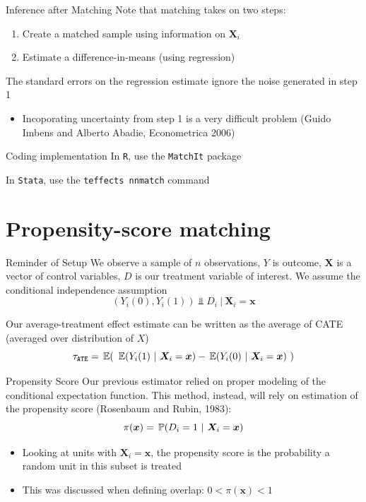 \documentclass[aspectratio=169,t,11pt,table]{beamer}
\begin{document}
\begin{frame}{Inference after Matching}
  Note that matching takes on two steps:
  \begin{enumerate}
    \item Create a matched sample using information on $\bm{X}_i$
    \item Estimate a difference-in-means (using regression)
  \end{enumerate}

  The standard errors on the regression estimate ignore the noise generated in step 1
  \begin{itemize}
    \item Incoporating uncertainty from step 1 is a very difficult problem (Guido Imbens and Alberto Abadie, Econometrica 2006)
  \end{itemize}
\end{frame}

\begin{frame}{Coding implementation}
  In \texttt{R}, use the \texttt{MatchIt} package

  \bigskip
  In \texttt{Stata}, use the \texttt{teffects nnmatch} command 
\end{frame}

\section{Propensity-score matching}

\begin{frame}{Reminder of Setup}
  We observe a sample of $n$ observations, $Y$ is outcome, $\bm{X}$ is a vector of control variables, $D$ is our treatment variable of interest. We assume the conditional independence assumption
  $$
    (Y_{i}(0), Y_{i}(1)) \Perp D_i \ \vert \ \bm{X}_i = \bm{x}
  $$

  \pause
  \bigskip
  Our average-treatment effect estimate can be written as the average of CATE (averaged over distribution of $X$)
  $$
    \tau_{\texttt{ATE}} = \expec{\ \expec{Y_i(1)}{\bm{X}_i = \bm{x}} - \expec{Y_i(0)}{\bm{X}_i = \bm{x}} \ }
  $$
\end{frame}

\begin{frame}{Propensity Score}
  Our previous estimator relied on proper modeling of the conditional expectation function. This method, instead, will rely on estimation of the \alert{propensity score} (Rosenbaum and Rubin, 1983):
  $$
    \pi(\bm{x}) = \prob{D_i = 1}{\bm{X}_i = \bm{x}}
  $$
  \begin{itemize}
    \item Looking at units with $\bm{X}_i = \bm{x}$, the propensity score is the probability a random unit in this subset is treated
    \item This was discussed when defining \alert{overlap}: $0 < \pi(\bm{x}) < 1$
  \end{itemize}
\end{frame}
\end{document}
